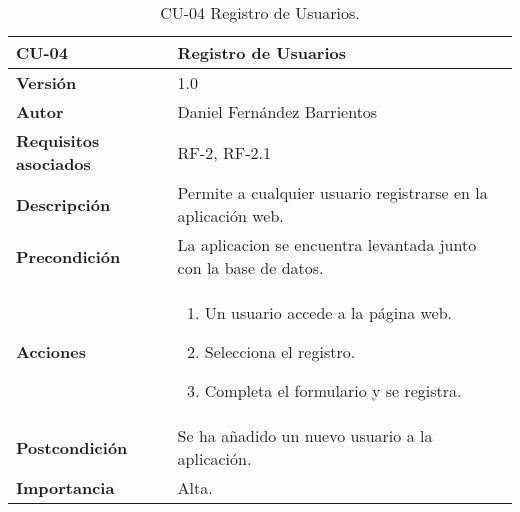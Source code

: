 \begin{table}[p]
	\centering
	\begin{tabularx}{\linewidth}{ p{} p{} }
		\toprule
		\textbf{CU-04}    & \textbf{Registro de Usuarios}\\
		\toprule
		\textbf{Versión}              & 1.0    \\
		\textbf{Autor}                & Daniel Fernández Barrientos \\
		\textbf{Requisitos asociados} & RF-2, RF-2.1 \\
		\textbf{Descripción}          & Permite a cualquier usuario registrarse en la aplicación web. \\
		\textbf{Precondición}         & La aplicacion se encuentra levantada junto con la base de datos. \\
		\textbf{Acciones}             &
		\begin{enumerate}
			\def\labelenumi{\arabic{enumi}.}
			\tightlist
			\item Un usuario accede a la página web.
			\item Selecciona el registro.
			\item Completa el formulario y se registra.
		\end{enumerate}\\
		\textbf{Postcondición}        & Se ha añadido un nuevo usuario a la aplicación. \\
		\textbf{Importancia}          & Alta. \\
		\bottomrule
	\end{tabularx}
	\caption{CU-04 Registro de Usuarios.}
\end{table}

